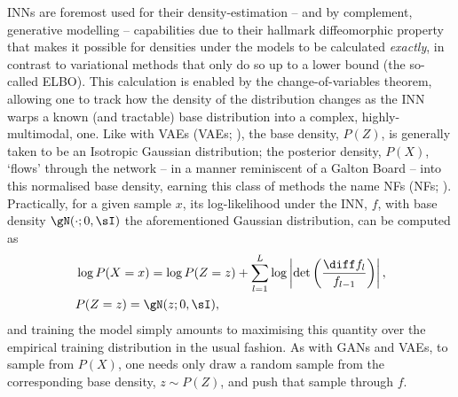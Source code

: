 \Acp{INN} are foremost used for their density-estimation -- and by complement, generative modelling
-- capabilities due to their hallmark diffeomorphic property that makes it possible for densities
under the models to be calculated \emph{exactly}, in contrast to variational methods that only do
so up to a lower bound (the so-called \ac{ELBO}). 
%
%
This calculation is enabled by the change-of-variables theorem, allowing one to track how the
density of the distribution changes as the \ac{INN} warps a known (and tractable) base distribution
into a complex, highly-multimodal, one.
%
Like with \aclp{VAE} (\acsp{VAE}; \citealp{kingma2014auto}), the base density, \(P(Z)\), is generally
taken to be an Isotropic Gaussian distribution; the posterior density, \(P(X)\), `flows' through
the network -- in a manner reminiscent of a Galton Board -- into this normalised base density,
earning this class of methods the name \aclp{NF} (\acsp{NF}; \citealp{rezende2015variational,
kobyzev2020normalizing}).
%
Practically, for a given sample \(x\), its log-likelihood under the \ac{INN}, \(f\), with base
density \(\gN(\cdot; 0, \sI)\) the aforementioned Gaussian distribution, can be computed as
%
\begin{equation*}
%
    \begin{aligned}
        &\log P(X=x) = 
        \log P(Z=z) + \sum_{l=1}^L \log \left| \det\left( \frac{\diff f_l}{ f_{l-1}}\right)
        \right|, \\
        &P(Z=z) = \gN(z; 0, \sI),
    \end{aligned}
\label{eq:cov}
%
\end{equation*}
%
and training the model simply amounts to maximising this quantity over the empirical training
distribution in the usual fashion.
%
As with \acp{GAN} and \acp{VAE}, to sample from \(P(X)\), one needs only draw a random sample from
the corresponding base density, \(z \sim P(Z) \), and push that sample through \(f\).


